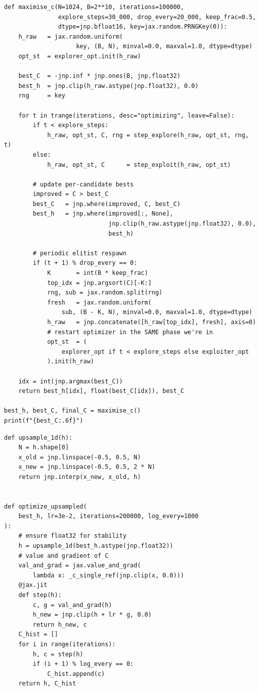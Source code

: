 \documentclass[11pt]{article}
\theoremstyle{definition}
\theoremstyle{remark}
\begin{document}
\pagebreak
\begin{lstlisting}[title={Gradient-based Search Routine}]
def maximise_c(N=1024, B=2**10, iterations=100000,
               explore_steps=30_000, drop_every=20_000, keep_frac=0.5,
               dtype=jnp.bfloat16, key=jax.random.PRNGKey(0)):
    h_raw   = jax.random.uniform(
                    key, (B, N), minval=0.0, maxval=1.0, dtype=dtype)
    opt_st  = explorer_opt.init(h_raw)

    best_C  = -jnp.inf * jnp.ones(B, jnp.float32)
    best_h  = jnp.clip(h_raw.astype(jnp.float32), 0.0)
    rng     = key

    for t in trange(iterations, desc="optimizing", leave=False):
        if t < explore_steps:
            h_raw, opt_st, C, rng = step_explore(h_raw, opt_st, rng, t)
        else:
            h_raw, opt_st, C      = step_exploit(h_raw, opt_st)

        # update per-candidate bests
        improved = C > best_C
        best_C   = jnp.where(improved, C, best_C)
        best_h   = jnp.where(improved[:, None],
                             jnp.clip(h_raw.astype(jnp.float32), 0.0),
                             best_h)

        # periodic elitist respawn
        if (t + 1) % drop_every == 0:
            K       = int(B * keep_frac)
            top_idx = jnp.argsort(C)[-K:]
            rng, sub = jax.random.split(rng)
            fresh   = jax.random.uniform(
                sub, (B - K, N), minval=0.0, maxval=1.0, dtype=dtype)
            h_raw   = jnp.concatenate([h_raw[top_idx], fresh], axis=0)
            # restart optimizer in the SAME phase we're in
            opt_st  = (
                explorer_opt if t < explore_steps else exploiter_opt
            ).init(h_raw)

    idx = int(jnp.argmax(best_C))
    return best_h[idx], float(best_C[idx]), best_C

best_h, best_C, final_C = maximise_c()
print(f"{best_C:.6f}")
\end{lstlisting}

\pagebreak
\begin{lstlisting}[title={Upsampling Procedure}]
def upsample_1d(h):
    N = h.shape[0]
    x_old = jnp.linspace(-0.5, 0.5, N)
    x_new = jnp.linspace(-0.5, 0.5, 2 * N)
    return jnp.interp(x_new, x_old, h)


def optimize_upsampled(
    best_h, lr=3e-2, iterations=200000, log_every=1000
):
    # ensure float32 for stability
    h = upsample_1d(best_h.astype(jnp.float32))
    # value and gradient of C
    val_and_grad = jax.value_and_grad(
        lambda x: _c_single_ref(jnp.clip(x, 0.0)))
    @jax.jit
    def step(h):
        c, g = val_and_grad(h)
        h_new = jnp.clip(h + lr * g, 0.0)
        return h_new, c
    C_hist = []
    for i in range(iterations):
        h, c = step(h)
        if (i + 1) % log_every == 0:
            C_hist.append(c)
    return h, C_hist

\end{lstlisting}


\end{document}
